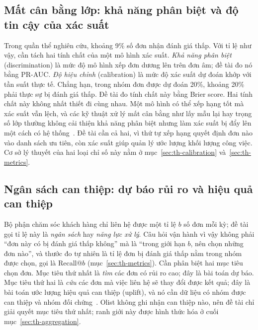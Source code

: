 \subsection{Mất cân bằng lớp: khả năng phân biệt và độ tin cậy của xác suất}\label{sec:con-imbalance}

Trong quần thể nghiên cứu, khoảng 9\% số đơn nhận đánh giá thấp. Với tỉ lệ như vậy, cần tách hai tính chất của một mô hình xác suất. \emph{Khả năng phân biệt} (discrimination) là mức độ mô hình xếp đơn dương lên trên đơn âm; đề tài đo nó bằng PR-AUC. \emph{Độ hiệu chỉnh} (calibration) là mức độ xác suất dự đoán khớp với tần suất thực tế. Chẳng hạn, trong nhóm đơn được dự đoán 20\%, khoảng 20\% phải thực sự bị đánh giá thấp. Đề tài đo tính chất này bằng Brier score. Hai tính chất này không nhất thiết đi cùng nhau. Một mô hình có thể xếp hạng tốt mà xác suất vẫn lệch, và các kỹ thuật xử lý mất cân bằng như lấy mẫu lại hay trọng số lớp thường không cải thiện khả năng phân biệt nhưng làm xác suất bị đẩy lên một cách có hệ thống~\parencite{vandengoorbergh2022}. Đề tài cần cả hai, vì thứ tự xếp hạng quyết định đơn nào vào danh sách ưu tiên, còn xác suất giúp quản lý ước lượng khối lượng công việc. Cơ sở lý thuyết của hai loại chỉ số này nằm ở mục~\ref{sec:th-calibration} và~\ref{sec:th-metrics}.

\subsection{Ngân sách can thiệp: dự báo rủi ro và hiệu quả can thiệp}\label{sec:con-budget}

Bộ phận chăm sóc khách hàng chỉ liên hệ được một tỉ lệ $b$ số đơn mỗi kỳ; đề tài gọi tỉ lệ này là \emph{ngân sách} hay \emph{năng lực xử lý}. Câu hỏi vận hành vì vậy không phải ``đơn này có bị đánh giá thấp không'' mà là ``trong giới hạn $b$, nên chọn những đơn nào'', và thước đo tự nhiên là tỉ lệ đơn bị đánh giá thấp nằm trong nhóm được chọn, gọi là Recall@$b$ (mục~\ref{sec:th-metrics}). Cần phân biệt hai mục tiêu chọn đơn. Mục tiêu thứ nhất là \emph{tìm} các đơn có rủi ro cao; đây là bài toán dự báo. Mục tiêu thứ hai là \emph{cứu} các đơn mà việc liên hệ sẽ thay đổi được kết quả; đây là bài toán ước lượng hiệu quả can thiệp (uplift), và nó cần dữ liệu có nhóm được can thiệp và nhóm đối chứng~\parencite{ascarza2018}. Olist không ghi nhận can thiệp nào, nên đề tài chỉ giải quyết mục tiêu thứ nhất; ranh giới này được hình thức hóa ở cuối mục~\ref{sec:th-aggregation}.


